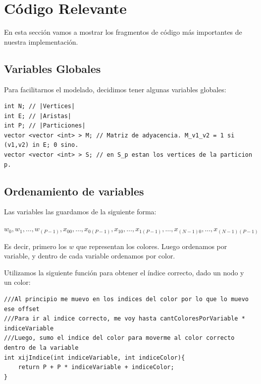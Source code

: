 \documentclass[a4paper, 10pt, twoside]{article}
\begin{document}





\newpage

\appendix

\section{Código Relevante}

En esta sección vamos a mostrar los fragmentos de código más importantes de nuestra implementación.

\subsection{Variables Globales}

Para facilitarnos el modelado, decidimos tener algunas variables globales:

\begin{lstlisting}
int N; // |Vertices|
int E; // |Aristas|
int P; // |Particiones|
vector <vector <int> > M; // Matriz de adyacencia. M_v1_v2 = 1 si (v1,v2) in E; 0 sino.
vector <vector <int> > S; // en S_p estan los vertices de la particion p.
\end{lstlisting}

\subsection{Ordenamiento de variables}

Las variables las guardamos de la siguiente forma:
\begin{center}
$w_0, w_1, \ldots, w_{(P-1)}, x_{00}, \ldots, x_{0(P-1)}, x_{10}, \ldots, x_{1(P-1)}, \ldots, x_{(N-1)0},\ldots, x_{(N-1)(P-1)}$
\end{center}

Es decir, primero los $w$ que representan los colores. Luego ordenamos por variable, y dentro de cada variable ordenamos por color.

Utilizamos la siguiente función para obtener el índice correcto, dado un nodo y un color:

\begin{lstlisting}
///Al principio me muevo en los indices del color por lo que lo muevo ese offset
///Para ir al indice correcto, me voy hasta cantColoresPorVariable * indiceVariable
///Luego, sumo el indice del color para moverme al color correcto dentro de la variable
int xijIndice(int indiceVariable, int indiceColor){
    return P + P * indiceVariable + indiceColor;
}
\end{lstlisting}
\end{document}
